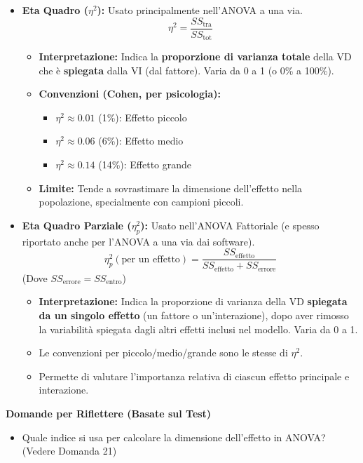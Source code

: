 \documentclass[12pt, a4paper]{article}
\newenvironment{reflectionbox}{%
    \medskip
    \begin{framed}\par\noindent
    \textbf{\color{boxtitlecolor}Domande per Riflettere (Basate sul Test)} \par
    \begin{itemize}[leftmargin=*, label=$\blacktriangleright$]
}{%
    \end{itemize}\par
    \end{framed}
    \medskip
}
\newcommand{\etasq}{\eta^2} %
\newcommand{\etasqpart}{\eta_p^2} %
\newcommand{\SSb}{SS_{\text{tra}}} %
\newcommand{\SSw}{SS_{\text{entro}}} %
\newcommand{\SStot}{SS_{\text{tot}}} %
\begin{document}
\begin{itemize}
    \item \textbf{Eta Quadro ($\etasq$):} Usato principalmente nell'ANOVA a una via.
        $$ \etasq = \frac{\SSb}{\SStot} $$
        \begin{itemize}
            \item \textbf{Interpretazione:} Indica la \textbf{proporzione di varianza totale} della VD che è \textbf{spiegata} dalla VI (dal fattore). Varia da 0 a 1 (o 0\% a 100\%).
            \item \textbf{Convenzioni (Cohen, per psicologia):}
                \begin{itemize}
                    \item $\etasq \approx 0.01$ (1\%): Effetto piccolo
                    \item $\etasq \approx 0.06$ (6\%): Effetto medio
                    \item $\etasq \approx 0.14$ (14\%): Effetto grande
                \end{itemize}
            \item \textbf{Limite:} Tende a sovrastimare la dimensione dell'effetto nella popolazione, specialmente con campioni piccoli.
        \end{itemize}
    \item \textbf{Eta Quadro Parziale ($\etasqpart$):} Usato nell'ANOVA Fattoriale (e spesso riportato anche per l'ANOVA a una via dai software).
        $$ \etasqpart (\text{per un effetto}) = \frac{SS_{\text{effetto}}}{SS_{\text{effetto}} + SS_{\text{errore}}} $$
        (Dove $SS_{\text{errore}} = \SSw$)
        \begin{itemize}
            \item \textbf{Interpretazione:} Indica la proporzione di varianza della VD \textbf{spiegata da un singolo effetto} (un fattore o un'interazione), dopo aver rimosso la variabilità spiegata dagli altri effetti inclusi nel modello. Varia da 0 a 1.
            \item Le convenzioni per piccolo/medio/grande sono le stesse di $\etasq$.
            \item Permette di valutare l'importanza relativa di ciascun effetto principale e interazione.
        \end{itemize}
\end{itemize}

\begin{reflectionbox}
    \item Quale indice si usa per calcolare la dimensione dell'effetto in ANOVA? (Vedere Domanda 21)
\end{reflectionbox}
\end{document}
